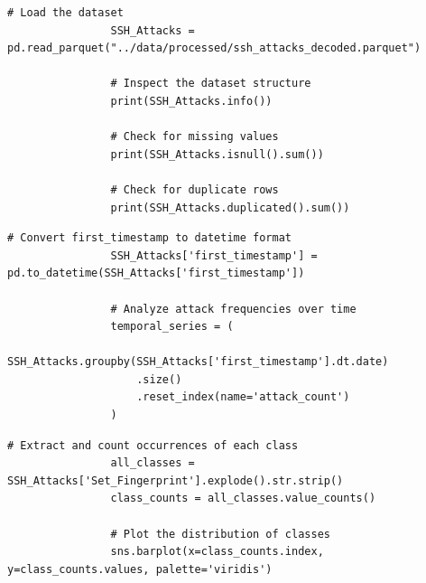             \begin{lstlisting}[caption={Load and inspect the dataset}, label={lst:load-inspect-dataset}]
                # Load the dataset
                SSH_Attacks = pd.read_parquet("../data/processed/ssh_attacks_decoded.parquet")
        
                # Inspect the dataset structure
                print(SSH_Attacks.info())
        
                # Check for missing values
                print(SSH_Attacks.isnull().sum())
        
                # Check for duplicate rows
                print(SSH_Attacks.duplicated().sum())
            \end{lstlisting}
            
            \vspace{0.5em}

            \begin{lstlisting}[caption={Convert timestamps and analyze frequencies}, label={lst:convert-analyze-frequencies}]
                # Convert first_timestamp to datetime format
                SSH_Attacks['first_timestamp'] = pd.to_datetime(SSH_Attacks['first_timestamp'])

                # Analyze attack frequencies over time
                temporal_series = (
                    SSH_Attacks.groupby(SSH_Attacks['first_timestamp'].dt.date)
                    .size()
                    .reset_index(name='attack_count')
                )
            \end{lstlisting}
            
            \vspace{0.5em}

            \begin{lstlisting}[caption={Extract and visualize class distribution}, label={lst:extract-visualize-classes}]
                # Extract and count occurrences of each class
                all_classes = SSH_Attacks['Set_Fingerprint'].explode().str.strip()
                class_counts = all_classes.value_counts()

                # Plot the distribution of classes
                sns.barplot(x=class_counts.index, y=class_counts.values, palette='viridis')
            \end{lstlisting}
            

